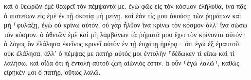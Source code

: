 \documentclass{openreader}
\begin{document}
καὶ ὁ θεωρῶν ἐμὲ θεωρεῖ τὸν πέμψαντά με. 
ἐγὼ φῶς εἰς τὸν κόσμον ἐλήλυθα, ἵνα πᾶς ὁ πιστεύων εἰς ἐμὲ ἐν τῇ σκοτίᾳ μὴ μείνῃ. 
καὶ ἐάν τίς μου ἀκούσῃ τῶν ῥημάτων καὶ μὴ ⸀φυλάξῃ, ἐγὼ οὐ κρίνω αὐτόν, οὐ γὰρ ἦλθον ἵνα κρίνω τὸν κόσμον ἀλλ’ ἵνα σώσω τὸν κόσμον. 
ὁ ἀθετῶν ἐμὲ καὶ μὴ λαμβάνων τὰ ῥήματά μου ἔχει τὸν κρίνοντα αὐτόν· ὁ λόγος ὃν ἐλάλησα ἐκεῖνος κρινεῖ αὐτὸν ἐν τῇ ἐσχάτῃ ἡμέρᾳ· 
ὅτι ἐγὼ ἐξ ἐμαυτοῦ οὐκ ἐλάλησα, ἀλλ’ ὁ πέμψας με πατὴρ αὐτός μοι ἐντολὴν ⸀δέδωκεν τί εἴπω καὶ τί λαλήσω. 
καὶ οἶδα ὅτι ἡ ἐντολὴ αὐτοῦ ζωὴ αἰώνιός ἐστιν. ἃ οὖν ⸂ἐγὼ λαλῶ⸃, καθὼς εἴρηκέν μοι ὁ πατήρ, οὕτως λαλῶ. 
\end{document}

